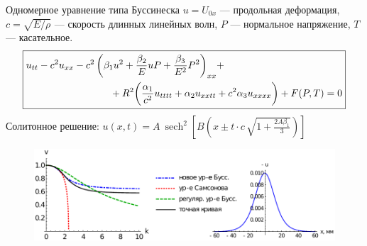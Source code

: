 \documentclass[usenames,dvipsnames]{beamer}
\DeclareMathOperator{\sech}{sech}
\begin{document}
\begin{frame}{Одномерное уравнение типа Буссинеска}
$u = U_{0x}$ --- продольная деформация, $c = \sqrt{E/\rho}$ --- скорость длинных линейных волн, $P$ --- нормальное напряжение, $T$ --- касательное.
\small
\begin{equation*}
\boxed{\begin{split}
&u_{tt} - c^2 u_{xx} - {\color{black}c^2\left(\beta_1 u^2 + \frac{\beta_2}{E} u P + \frac{\beta_3}{E^2} P^2\right)_{xx}} +\\
&\hspace{30mm} + {\color{black}R^2 \bigg(\frac{\alpha_1}{c^2} u_{tttt} + \alpha_2 u_{xxtt} + c^2\alpha_3 u_{xxxx} \bigg)} + F(P, T) = 0
\end{split}}
\end{equation*}
\normalsize 
Солитонное решение: $u(x,t) = A\ \sech^2\left[B \left(x\pm t\cdot c\,\sqrt{1+\frac{2A \beta_1}{3}}\right) \right]$
\begin{figure}
\vspace{-6mm}
\includegraphics[width=1.02\linewidth]{Figures/Disp_Sol}
\end{figure}

\end{frame}
\end{document}
